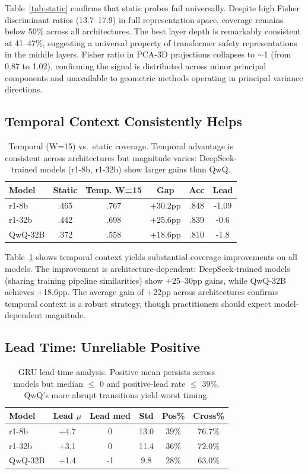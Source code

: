 \documentclass[11pt,a4paper]{article}
\begin{document}
Table~\ref{tab:static} confirms that static probes fail universally. Despite high Fisher discriminant ratios (13.7--17.9) in full representation space, coverage remains below 50\% across all architectures. The best layer depth is remarkably consistent at 41--47\%, suggesting a universal property of transformer safety representations in the middle layers. Fisher ratio in PCA-3D projections collapses to $\sim$1 (from 0.87 to 1.02), confirming the signal is distributed across minor principal components and unavailable to geometric methods operating in principal variance directions.

\subsection{Temporal Context Consistently Helps}
\label{sec:temporal}

\begin{table}[t]
\centering
\small
\begin{tabular}{lccccc}
\toprule
Model & Static & Temp. W=15 & Gap & Acc & Lead \\
\midrule
r1-8b & .465 & .767 & +30.2pp & .848 & -1.09 \\
r1-32b & .442 & .698 & +25.6pp & .839 & -0.6 \\
QwQ-32B & .372 & .558 & +18.6pp & .810 & -1.8 \\
\bottomrule
\end{tabular}
\caption{Temporal (W=15) vs.\ static coverage. Temporal advantage is consistent across architectures but magnitude varies: DeepSeek-trained models (r1-8b, r1-32b) show larger gains than QwQ.}
\label{tab:temporal}
\end{table}

Table~\ref{tab:temporal} shows temporal context yields substantial coverage improvements on all models. The improvement is architecture-dependent: DeepSeek-trained models (sharing training pipeline similarities) show +25--30pp gains, while QwQ-32B achieves +18.6pp. The average gain of +22pp across architectures confirms temporal context is a robust strategy, though practitioners should expect model-dependent magnitude.

\subsection{Lead Time: Unreliable Positive}
\label{sec:lead}

\begin{table}[t]
\centering
\small
\begin{tabular}{lccccc}
\toprule
Model & Lead $\mu$ & Lead med & Std & Pos\% & Cross\% \\
\midrule
r1-8b & +4.7 & 0 & 13.0 & 39\% & 76.7\% \\
r1-32b & +3.1 & 0 & 11.4 & 36\% & 72.0\% \\
QwQ-32B & +1.4 & -1 & 9.8 & 28\% & 63.0\% \\
\bottomrule
\end{tabular}
\caption{GRU lead time analysis. Positive mean persists across models but median $\leq$ 0 and positive-lead rate $\leq$ 39\%. QwQ's more abrupt transitions yield worst timing.}
\label{tab:lead}
\end{table}
\end{document}
